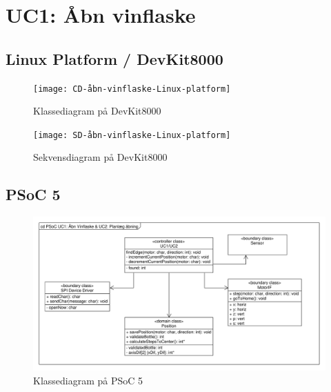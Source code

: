 \section{UC1: Åbn vinflaske}

\subsection{Linux Platform / DevKit8000}
\begin{figure}[H]
	\caption{Klassediagram  på DevKit8000}
	\label{CD:UC1-devkit}
	\texttt{[image: CD-åbn-vinflaske-Linux-platform]}
\end{figure}

\begin{figure}[H]
	\caption{Sekvensdiagram  på DevKit8000}
	\label{SD:UC1-devkit}
	\texttt{[image: SD-åbn-vinflaske-Linux-platform]}
\end{figure}

\subsection{PSoC 5}
\begin{figure}[H]
	\caption{Klassediagram  på PSoC 5}
	\label{CD:PSoC:UC1}
	\includegraphics[scale=0.38,trim=0 0 0 0, clip]{UC1_og_UC2_CD}
\end{figure}

